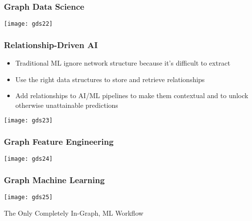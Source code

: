 \begin{frame}[fragile]\frametitle{Graph Data Science}

\begin{center}
\texttt{[image: gds22]}
\end{center}

\end{frame}

\begin{frame}[fragile]\frametitle{Relationship-Driven AI}

\begin{itemize}
\item Traditional ML ignore network structure because it’s difficult to extract
\item Use the right data structures to store and retrieve relationships 
\item Add relationships to AI/ML pipelines to make them contextual and to unlock otherwise unattainable predictions
\end{itemize}

\begin{center}
\texttt{[image: gds23]}
\end{center}

\end{frame}


\begin{frame}[fragile]\frametitle{Graph Feature Engineering}

\begin{center}
\texttt{[image: gds24]}
\end{center}

\end{frame}


\begin{frame}[fragile]\frametitle{Graph Machine Learning}

\begin{center}
\texttt{[image: gds25]}
\end{center}

The Only Completely In-Graph, ML Workflow

\end{frame}

